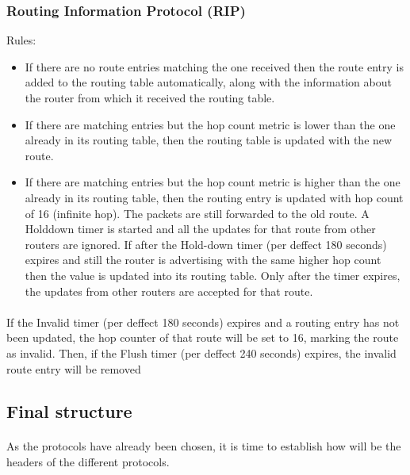 \subsubsection*{Routing Information Protocol (RIP)\cite{RIPv2}\cite{RIPng}}
Rules:
\begin{itemize}
\item{} If there are no route entries matching the one received then the route entry is added to the routing table automatically, along with the information about the router from which it received the routing table.
\item{} If there are matching entries but the hop count metric is lower than the one already in its routing table, then the routing table is updated with the new route.
\item{} If there are matching entries but the hop count metric is higher than the one already in its routing table, then the routing entry is updated with hop count of 16 (infinite hop). The packets are still forwarded to the old route. A Holddown timer is started and all the updates for that route from other routers are ignored. If after the Hold-down timer (per deffect 180 seconds) expires and still the router is advertising with the same higher hop count then the value is updated into its routing table. Only after the timer expires, the updates from other routers are accepted for that route.
\end{itemize}
\paragraph{}If the Invalid timer (per deffect 180 seconds) expires and a routing entry has not been updated, the hop counter of that route will be set to 16, marking the route as invalid. Then, if the Flush timer (per deffect 240 seconds) expires, the invalid route entry will be removed

\subsection{Final structure}
\paragraph{}As the protocols have already been chosen, it is time to establish how will be the headers of the different protocols.
